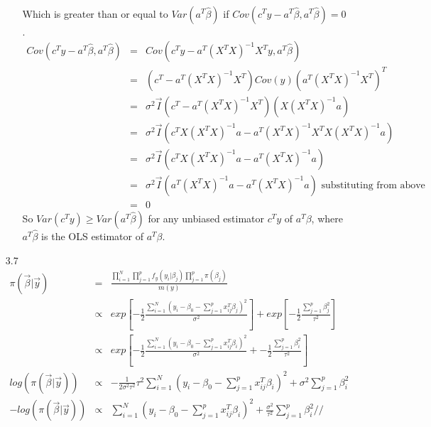 \documentclass{article}
\begin{document}
\begin{enumerate}
\begin{enumerate}
\begin{eqnarray*}
      \end{eqnarray*}
      Which is greater than or equal to $Var(a^T\hat\beta)$ if $Cov(c^Ty - a^T\hat\beta,a^T\hat\beta) = 0$.
      \begin{eqnarray*}
        Cov(c^Ty - a^T\hat\beta,a^T\hat\beta) &=& Cov(c^Ty-a^T(X^TX)^{-1}X^Ty,a^T\hat\beta) \\
                                              &=& (c^T-a^T(X^TX)^{-1}X^T)Cov(y)(a^T(X^TX)^{-1}X^T)^T \\
                                              &=& \sigma^2\vec{I}(c^T-a^T(X^TX)^{-1}X^T)(X(X^TX)^{-1}a) \\
                                              &=& \sigma^2\vec{I}(c^TX(X^TX)^{-1}a - a^T(X^TX)^{-1}X^TX(X^TX)^{-1}a) \\
                                              &=& \sigma^2\vec{I}(c^TX(X^TX)^{-1}a - a^T(X^TX)^{-1}a) \\
                                              &=& \sigma^2\vec{I}(a^T(X^TX)^{-1}a - a^T(X^TX)^{-1}a) \text{ substituting from above} \\
                                              &=& 0
      \end{eqnarray*}
      So $Var(c^Ty) \ge Var(a^T\hat\beta)$ for any unbiased estimator $c^Ty$ of $a^T\beta$, where $a^T\hat\beta$ is the OLS estimator of $a^T\beta$. 
    \end{enumerate}
    \item[3.7]
      \begin{eqnarray*}
        \pi(\vec{\beta}|\vec{y}) &=& \frac{\prod_{i=1}^N\prod_{j=1}^p f_y(y_i|\beta_j)\prod_{j=1}^p\pi(\beta_j)}{m(y)} \\
                                 &\propto& exp\left[-\frac{1}{2}\frac{\sum_{i=1}^N(y_i - \beta_0 - \sum_{j=1}^px_{ij}^T\beta_j)^2}{\sigma^2}\right]
                                        + exp\left[-\frac{1}{2}\frac{\sum_{j=1}^p\beta_j^2}{\tau^2}\right] \\
                                 &\propto& exp\left[-\frac{1}{2}\frac{\sum_{i=1}^N(y_i - \beta_0 - \sum_{j=1}^px_{ij}^T\beta_i)^2}{\sigma^2} 
                                        + -\frac{1}{2}\frac{\sum_{j=1}^p\beta_i^2}{\tau^2}\right] \\
   log(\pi(\vec{\beta}|\vec{y})) &\propto& -\frac{1}{2\sigma^2\tau^2}\tau^2\sum_{i=1}^{N}(y_i - \beta_0 - \sum_{j=1}^px_{ij}^T\beta_i)^2 + \sigma^2\sum_{j=1}^p\beta_i^2 \\
  -log(\pi(\vec{\beta}|\vec{y})) &\propto& \sum_{i=1}^{N}(y_i - \beta_0 - \sum_{j=1}^px_{ij}^T\beta_i)^2 + \frac{\sigma^2}{\tau^2}\sum_{j=1}^p\beta_i^2 //\\

\end{eqnarray*}
\end{enumerate}
\end{document}
